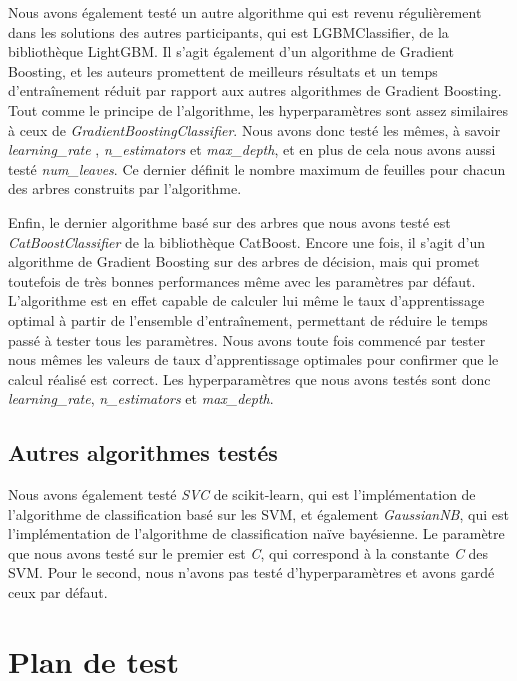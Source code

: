 \documentclass[a4paper]{article}
\begin{document}
    Nous avons également testé un autre algorithme qui est revenu régulièrement dans les solutions des autres participants, qui est LGBMClassifier,
    de la bibliothèque LightGBM. Il s'agit également d'un algorithme de Gradient Boosting, et les auteurs promettent de meilleurs résultats et un temps 
    d'entraînement réduit par rapport aux autres algorithmes de Gradient Boosting.
    Tout comme le principe de l'algorithme, les hyperparamètres sont assez similaires à ceux de {\it GradientBoostingClassifier}. Nous avons donc testé les
    mêmes, à savoir {\it learning\_rate }, {\it n\_estimators} et {\it max\_depth}, et en plus de cela nous avons aussi testé {\it num\_leaves}. Ce dernier définit
    le nombre maximum de feuilles pour chacun des arbres construits par l'algorithme.

    Enfin, le dernier algorithme basé sur des arbres que nous avons testé est {\it CatBoostClassifier} de la bibliothèque CatBoost.
    Encore une fois, il s'agit d'un algorithme de Gradient Boosting sur des arbres de décision, mais qui promet toutefois 
    de très bonnes performances même avec les paramètres par défaut.
    L'algorithme est en effet capable de calculer lui même le taux d'apprentissage optimal à partir de l'ensemble d'entraînement, permettant de
    réduire le temps passé à tester tous les paramètres. Nous avons toute fois commencé par tester nous mêmes les valeurs 
    de taux d'apprentissage optimales pour confirmer que le calcul réalisé est correct.
    Les hyperparamètres que nous avons testés sont donc {\it learning\_rate}, {\it n\_estimators} et {\it max\_depth}.

    \subsection{Autres algorithmes testés}

    Nous avons également testé {\it SVC} de scikit-learn, qui est l'implémentation de l'algorithme de classification basé sur les SVM, et
    également {\it GaussianNB}, qui est l'implémentation de l'algorithme de classification naïve bayésienne.
    Le paramètre que nous avons testé sur le premier est {\it C}, qui correspond à la constante {\it C}
    des SVM.
    Pour le second, nous n'avons pas testé d'hyperparamètres et avons gardé ceux par défaut.

    \section{Plan de test}
\end{document}
